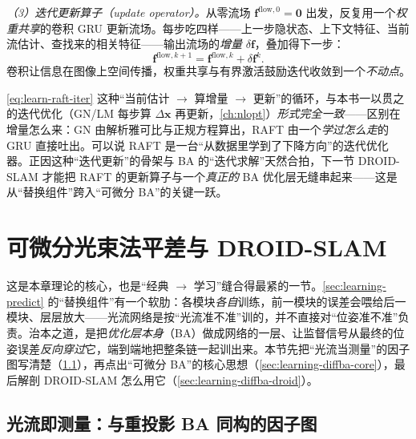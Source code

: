 \emph{（3）迭代更新算子（update operator）。}\;从零流场 $\mathbf{f}^{\mathrm{flow},0}=\mathbf{0}$ 出发，反复用一个\emph{权重共享}的卷积 GRU 更新流场。每步吃四样——上一步隐状态、上下文特征、当前流估计、查找来的相关特征——输出流场的\emph{增量} $\delta\mathbf{f}$，叠加得下一步：
\begin{equation}
  \mathbf{f}^{\mathrm{flow},k+1}=\mathbf{f}^{\mathrm{flow},k}+\delta\mathbf{f}^{k}.
  \label{eq:learn-raft-iter}
\end{equation}
卷积让信息在图像上空间传播，权重共享与有界激活鼓励迭代收敛到一个\emph{不动点}。

\begin{insight}[RAFT $=$“学过的”迭代优化器]
\cref{eq:learn-raft-iter} 这种“当前估计 $\to$ 算增量 $\to$ 更新”的循环，与本书一以贯之的迭代优化（GN/LM 每步算 $\Delta\mathbf{x}$ 再更新，\cref{ch:nlopt}）\emph{形式完全一致}——区别在增量怎么来：GN 由解析雅可比与正规方程算出，RAFT 由一个\emph{学过怎么走}的 GRU 直接吐出。可以说 RAFT 是一台“从数据里学到了下降方向”的迭代优化器。正因这种“迭代更新”的骨架与 BA 的“迭代求解”天然合拍，下一节 DROID-SLAM 才能把 RAFT 的更新算子与一个\emph{真正的} BA 优化层无缝串起来——这是从“替换组件”跨入“可微分 BA”的关键一跃。
\end{insight}

\section{可微分光束法平差与 DROID-SLAM}
\label{sec:learning-diffba}

这是本章理论的核心，也是“经典 $\to$ 学习”缝合得最紧的一节。\cref{sec:learning-predict} 的“替换组件”有一个软肋：各模块\emph{各自}训练，前一模块的误差会喂给后一模块、层层放大——光流网络是按“光流准不准”训的，并不直接对“位姿准不准”负责\cite{teed2026boosting}。治本之道，是把\emph{优化层本身}（BA）做成网络的一层、让监督信号从最终的位姿误差\emph{反向穿过}它，端到端地把整条链一起训出来。本节先把“光流当测量”的因子图写清楚（\cref{sec:learning-diffba-flow}），再点出“可微分 BA”的核心思想（\cref{sec:learning-diffba-core}），最后解剖 DROID-SLAM 怎么用它（\cref{sec:learning-diffba-droid}）。

\subsection{光流即测量：与重投影 BA 同构的因子图}
\label{sec:learning-diffba-flow}

